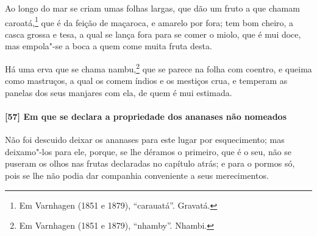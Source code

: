 \begin{linenumbers}
Ao longo do mar se criam umas folhas largas, que dão um fruto a que chamam
caroatá,\footnote{ Em Varnhagen (1851 e 1879), ``carauatá''. Gravatá.} que é da feição de
maçaroca, e amarelo por fora; tem bom cheiro, a casca grossa e tesa, a qual se lança fora
para se comer o miolo, que é mui doce, mas empola"-se a boca a quem come muita fruta desta.

Há uma erva que se chama nambu,\footnote{ Em Varnhagen (1851 e 1879), ``nhamby''. Nhambi.}
que se parece na folha com coentro, e queima como mastruços, a qual os comem índios e os
mestiços crua, e temperam as panelas dos seus manjares com ela, de quem é mui estimada.

\paragraph{[57] Em que se declara a propriedade dos ananases não nomeados}\quad
Não foi descuido deixar os ananases para este lugar por esquecimento; mas deixamo"-los para
ele, porque, se lhe déramos o primeiro, que é o seu, não se puseram os olhos nas frutas
declaradas no capítulo atrás; e para o pormos só, pois se lhe não podia dar companhia
conveniente a seus merecimentos.


\end{linenumbers}
